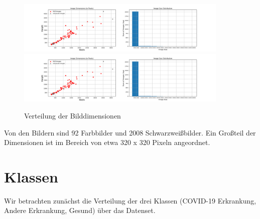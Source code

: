 \begin{figure}[H]
	\centering
	\includegraphics[trim=110px 0 0.5\imagewidth{} 0, clip,width=0.9\textwidth]{../image_sizes.png}
	\includegraphics[trim=0.5\imagewidth{} 0 110px 0, clip,width=0.9\textwidth]{../image_sizes.png}
	\caption{Verteilung der Bilddimensionen}
\end{figure}

Von den Bildern sind 92 Farbbilder und 2008 Schwarzweißbilder. Ein Großteil der Dimensionen ist im Bereich von etwa 320 x 320 Pixeln angeordnet.

\section{Klassen}

Wir betrachten zunächst die Verteilung der drei Klassen (COVID-19 Erkrankung, Andere Erkrankung, Gesund) über das Datenset.

